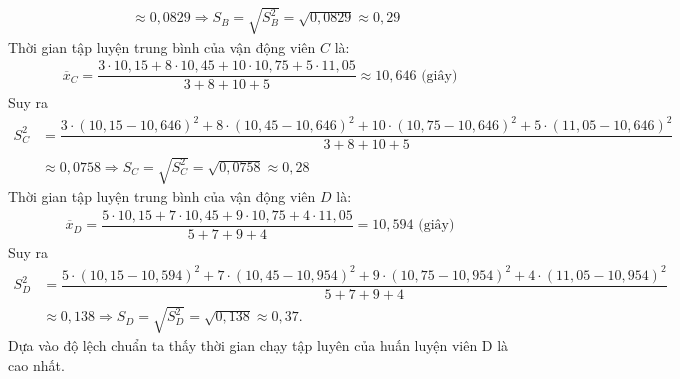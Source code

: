 \begin{ex}
{\begin{align*}
			& \approx 0,0829 \Rightarrow {S}_{{B}}=\sqrt{{S}_{{B}}^{2}}=\sqrt{0,0829} \approx 0,29
		\end{align*}
		Thời gian tập luyện trung bình của vận động viên $C$ là:
		\begin{align*}
			\overline{{x}}_{C}=\dfrac{3 \cdot 10,15+8 \cdot 10,45+10 \cdot 10,75+5 \cdot 11,05}{3+8+10+5} \approx 10,646 \text{ (giây)}
		\end{align*}
		Suy ra
		\begin{align*}
			{S}_{{C}}^{2} & =\dfrac{3 \cdot(10,15-10,646)^{2}+8 \cdot(10,45-10,646)^{2}+10 \cdot(10,75-10,646)^{2}+5 \cdot(11,05-10,646)^{2}}{3+8+10+5} \\
			& \approx 0,0758 \Rightarrow {S}_{{C}}=\sqrt{{S}_{{C}}^{2}}=\sqrt{0,0758} \approx 0,28
		\end{align*}
		Thời gian tập luyện trung bình của vận động viên $D$ là:
		\begin{align*}
			\overline{{x}}_{{D}}=\dfrac{5 \cdot 10,15+7 \cdot 10,45+9 \cdot 10,75+4 \cdot 11,05}{5+7+9+4}=10,594  \text{ (giây)}
		\end{align*}
		Suy ra
		\begin{align*}
			{S}_{D}^{2} & =\dfrac{5 \cdot(10,15-10,594)^{2}+7 \cdot(10,45-10,954)^{2}+9 \cdot(10,75-10,954)^{2}+4 \cdot(11,05-10,954)^{2}}{5+7+9+4} \\
			& \approx 0,138 \Rightarrow {S}_{D}=\sqrt{{S}_{D}^{2}}=\sqrt{0,138} \approx 0,37.
		\end{align*}
		Dựa vào độ lệch chuẩn ta thấy thời gian chạy tập luyên của huấn luyện viên D là cao nhất.
	}
\end{ex}

